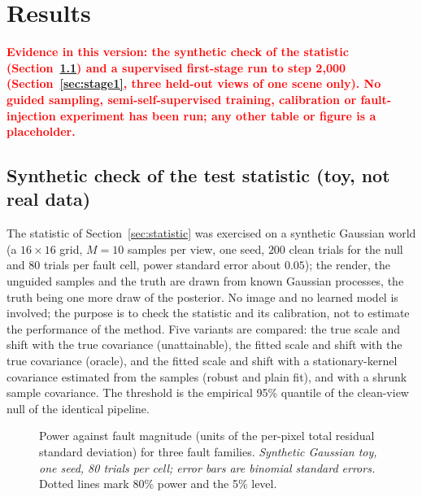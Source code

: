 \section{Results}
\label{sec:results}
\textcolor{red}{\textbf{Evidence in this version: the synthetic check of the statistic (Section~\ref{sec:toy}) and a supervised first-stage run to step 2{,}000 (Section~\ref{sec:stage1}, three held-out views of one scene only). No guided sampling, semi-self-supervised training, calibration or fault-injection experiment has been run; any other table or figure is a placeholder.}}

\subsection{Synthetic check of the test statistic (toy, not real data)}
\label{sec:toy}
The statistic of Section~\ref{sec:statistic} was exercised on a synthetic Gaussian world (a $16\times16$ grid, $M=10$ samples per view, one seed,
$200$ clean trials for the null and $80$ trials per fault cell, power standard error about $0.05$); the render, the unguided samples and the truth are
drawn from known Gaussian processes, the truth being one more draw of the posterior. No image and no learned model is involved; the purpose is to check the
statistic and its calibration, not to estimate the performance of the method. Five variants are compared: the true scale and shift with the true covariance
(unattainable), the fitted scale and shift with the true covariance (oracle), and the fitted scale and shift with a stationary-kernel covariance estimated from the
samples (robust and plain fit), and with a shrunk sample covariance. The threshold is the empirical 95\% quantile of the clean-view null of the identical pipeline.

\begin{figure}[!t]
  \centering
  \setlength{\figw}{\linewidth}
  \caption{Power against fault magnitude (units of the per-pixel total residual standard deviation) for three fault families. \emph{Synthetic Gaussian toy, one seed,
  80 trials per cell; error bars are binomial standard errors.} Dotted lines mark 80\% power and the 5\% level.}
  \label{fig:toy-power}
\end{figure}

